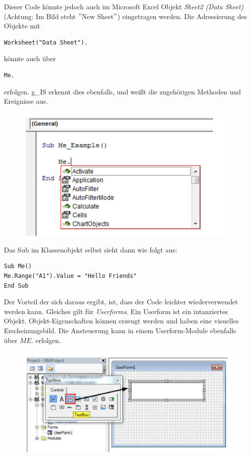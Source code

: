 Dieser Code könnte jedoch auch im Microsoft Excel Objekt \textit{Sheet2 (Data Sheet)} (Achtung: Im Bild steht $"$New Sheet$"$) eingetragen werden. Die Adressierung des Objekte mit
\begin{lstlisting}[style=VBA]
Worksheet("Data Sheet").
\end{lstlisting}
könnte auch über 
\begin{lstlisting}[style=VBA]
Me.
\end{lstlisting}
erfolgen. \gls{g_IS} erkennt dies ebenfalls, und weißt die zugehörigen Methoden und Ereignisse aus.
\begin{figure}[H]
	\centering
	\includegraphics[scale = 0.3]{attachment/chapter_2/Scc055}
	\caption{}
	\label{fig:Scc055}
\end{figure}
Das Sub im Klassenobjekt selbst sieht dann wie folgt aus:
\begin{lstlisting}[style=VBA]
Sub Me()
Me.Range("A1").Value = "Hello Friends"
End Sub
\end{lstlisting}
Der Vorteil der sich daraus ergibt, ist, dass der Code leichter wiederverwendet werden kann. 
Gleiches gilt für \textit{Userforms}. Ein Userform ist ein intanziertes Objekt. Objekt-Eigenschaften können erzeugt werden und haben eine visuelles Erscheinungsbild. Die Ansteuerung kann in einem Userform-Module ebenfalls über $ME.$ erfolgen.
\begin{figure}[H]
	\centering
	\includegraphics[scale = 0.3]{attachment/chapter_2/Scc056}
	\caption{}
	\label{fig:Scc056}
\end{figure}
